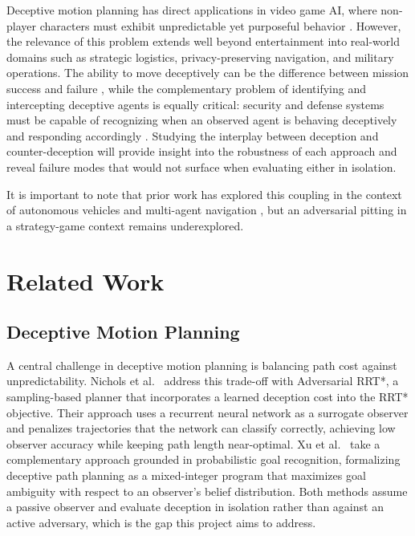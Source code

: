 \documentclass[letterpaper, 10pt, conference]{ieeeconf}
\begin{document}
Deceptive motion planning has direct applications in video game AI, where non-player characters must exhibit unpredictable yet purposeful behavior \cite{tastan2012learning, zeng2023recognition}. However, the relevance of this problem extends well beyond entertainment into real-world domains such as strategic logistics, privacy-preserving navigation, and military operations. The ability to move deceptively can be the difference between mission success and failure \cite{xu2020single, nichols2022adversarial}, while the complementary problem of identifying and intercepting deceptive agents is equally critical: security and defense systems must be capable of recognizing when an observed agent is behaving deceptively and responding accordingly \cite{zeng2023recognition, xu2019goal}. Studying the interplay between deception and counter-deception will provide insight into the robustness of each approach and reveal failure modes that would not surface when evaluating either in isolation.

It is important to note that prior work has explored this coupling in the context of autonomous vehicles \cite{espinoza2022deep} and multi-agent navigation \cite{netter2024motion, lecleach2021lucidgames}, but an adversarial pitting in a strategy-game context remains underexplored.

\section{Related Work} \label{sec:related-work}

\subsection{Deceptive Motion Planning} \label{sec:related-work/deceptive-motion-planning}

A central challenge in deceptive motion planning is balancing path cost against unpredictability. Nichols et al.\ \cite{nichols2022adversarial} address this trade-off with Adversarial RRT*, a sampling-based planner that incorporates a learned deception cost into the RRT* objective. Their approach uses a recurrent neural network as a surrogate observer and penalizes trajectories that the network can classify correctly, achieving low observer accuracy while keeping path length near-optimal. Xu et al.\ \cite{xu2020single} take a complementary approach grounded in probabilistic goal recognition, formalizing deceptive path planning as a mixed-integer program that maximizes goal ambiguity with respect to an observer's belief distribution. Both methods assume a passive observer and evaluate deception in isolation rather than against an active adversary, which is the gap this project aims to address.
\end{document}
